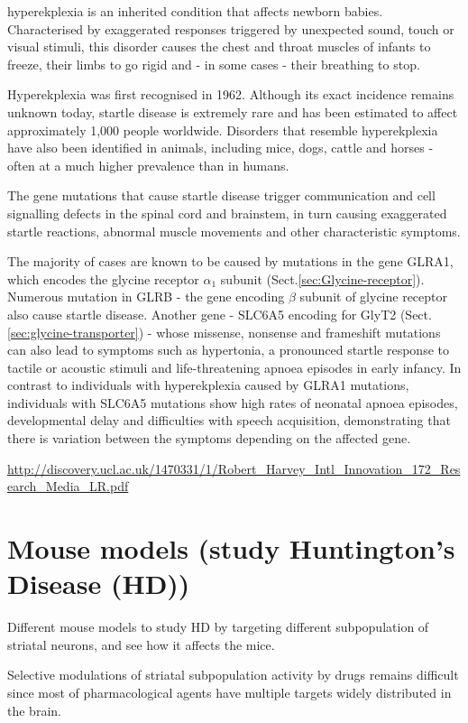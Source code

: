 hyperekplexia is an inherited condition that affects newborn babies.
Characterised by exaggerated responses triggered by unexpected sound, touch or
visual stimuli, this disorder causes the chest and throat muscles of infants to
freeze, their limbs to go rigid and - in some cases - their breathing to stop.

Hyperekplexia was first recognised in 1962.
Although its exact incidence remains unknown today, startle disease is extremely
rare and has been estimated to affect approximately 1,000 people worldwide.
Disorders that resemble hyperekplexia have also been identified in animals,
including mice, dogs, cattle and horses - often at a much higher prevalence than
in humans.

The gene mutations that cause startle disease trigger communication and cell
signalling defects in the spinal cord and brainstem, in turn causing exaggerated
startle reactions, abnormal muscle movements and other characteristic symptoms.

The majority of cases are known to be caused by mutations in the gene GLRA1,
which encodes the glycine receptor $\alpha_1$ subunit
(Sect.\ref{sec:Glycine-receptor}).
Numerous mutation in GLRB - the gene encoding $\beta$ subunit of glycine
receptor also cause startle disease.
Another gene - SLC6A5 encoding for GlyT2 (Sect.\ref{sec:glycine-transporter}) -
whose missense, nonsense and frameshift mutations can also lead to symptoms such
as hypertonia, a pronounced startle response to tactile or acoustic stimuli and
life-threatening apnoea episodes in early infancy.
In contrast to individuals with hyperekplexia caused by GLRA1 mutations,
individuals with SLC6A5 mutations show high rates of neonatal apnoea
episodes, developmental delay and difficulties with speech acquisition, demonstrating
that there is variation between the symptoms depending on the affected gene.

\url{http://discovery.ucl.ac.uk/1470331/1/Robert_Harvey_Intl_Innovation_172_Research_Media_LR.pdf}

\section{Mouse models (study Huntington's Disease (HD))}
\label{sec:mouse-model-HD-Huntington}

Different mouse models to study HD by targeting different subpopulation of
striatal neurons, and see how it affects the mice.

Selective modulations of striatal subpopulation activity by drugs remains
difficult since most of pharmacological agents have multiple targets widely
distributed in the brain.  

